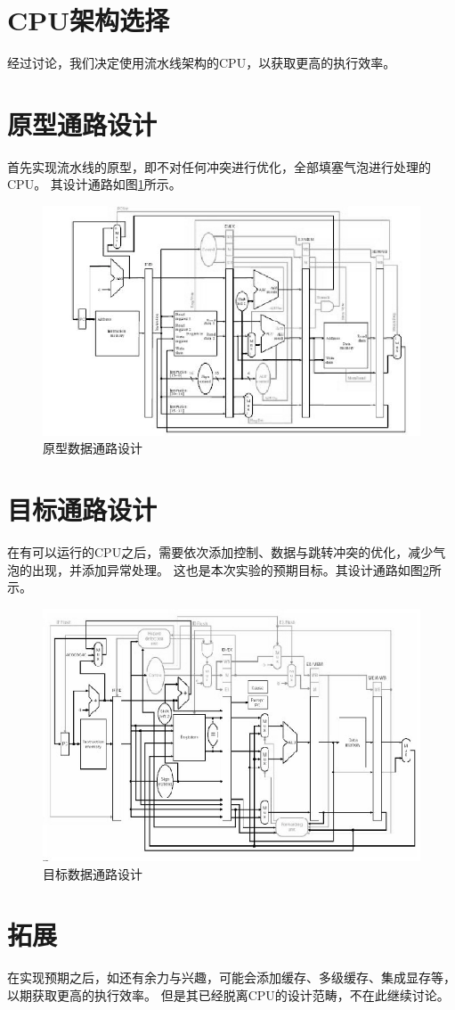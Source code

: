 \section{CPU架构选择}
  经过讨论，我们决定使用流水线架构的CPU，以获取更高的执行效率。
\section{原型通路设计}
  首先实现流水线的原型，即不对任何冲突进行优化，全部填塞气泡进行处理的CPU。
  其设计通路如图\ref{naive}所示。
  \begin{figure}[htbp]
   \centerline{\includegraphics[width=\textwidth]{./figure/naive}}
   \caption{原型数据通路设计\label{naive}}
  \end{figure}
\section{目标通路设计}
  在有可以运行的CPU之后，需要依次添加控制、数据与跳转冲突的优化，减少气泡的出现，并添加异常处理。
  这也是本次实验的预期目标。其设计通路如图\ref{except}所示。
  \begin{figure}[htbp]
   \centerline{\includegraphics[width=\textwidth]{./figure/except}}
   \caption{目标数据通路设计\label{except}}
  \end{figure}
\section{拓展}
  在实现预期之后，如还有余力与兴趣，可能会添加缓存、多级缓存、集成显存等，以期获取更高的执行效率。
  但是其已经脱离CPU的设计范畴，不在此继续讨论。
